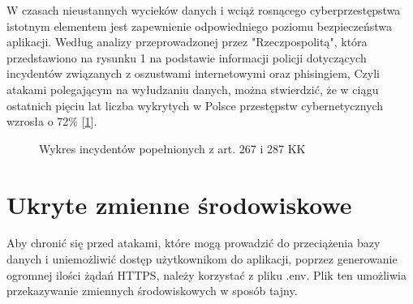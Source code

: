 W czasach nieustannych wycieków danych i wciąż rosnącego cyberprzestępstwa istotnym elementem jest zapewnienie odpowiedniego poziomu bezpieczeństwa aplikacji. Według analizy przeprowadzonej przez "Rzeczpospolitą", która przedstawiono na rysunku 1 na podstawie informacji policji dotyczących incydentów związanych z oszustwami internetowymi oraz phisingiem, Czyli atakami polegającym na wyłudzaniu danych, \cite{phishing}  można stwierdzić, że w ciągu ostatnich pięciu lat liczba wykrytych w Polsce przestępstw cybernetycznych wzrosła o 72\% \cite{wykresbezpieczenstwo} [\ref{fig:Wykres}].

\begin{figure}[h]
	\centering
	\caption{Wykres incydentów popełnionych z art. 267 i 287 KK}
	\label{fig:Wykres}
\end{figure}

\section*{Ukryte zmienne środowiskowe}

Aby chronić się przed atakami, które mogą prowadzić do przeciążenia bazy danych i uniemożliwić dostęp użytkownikom do aplikacji, poprzez generowanie ogromnej ilości żądań HTTPS, należy korzystać z pliku .env. Plik ten umożliwia przekazywanie zmiennych środowiskowych w sposób tajny.


